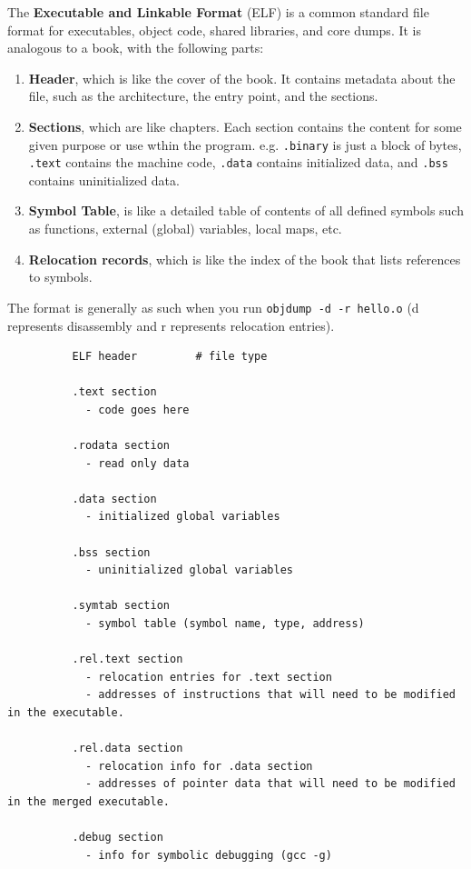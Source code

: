 \documentclass{article}
\begin{document}
      \begin{definition}[ELF]
        The \textbf{Executable and Linkable Format} (ELF) is a common standard file format for executables, object code, shared libraries, and core dumps. It is analogous to a book, with the following parts: 
        \begin{enumerate}
          \item \textbf{Header}, which is like the cover of the book. It contains metadata about the file, such as the architecture, the entry point, and the sections. 
          \item \textbf{Sections}, which are like chapters. Each section contains the content for some given purpose or use wthin the program. e.g. \texttt{.binary} is just a block of bytes, \texttt{.text} contains the machine code, \texttt{.data} contains initialized data, and \texttt{.bss} contains uninitialized data.
          \item \textbf{Symbol Table}, is like a detailed table of contents of all defined symbols such as functions, external (global) variables, local maps, etc. 
          \item \textbf{Relocation records}, which is like the index of the book that lists references to symbols. 
        \end{enumerate}
        The format is generally as such when you run \texttt{objdump -d -r hello.o} (d represents disassembly and r represents relocation entries).

        \begin{lstlisting}
          ELF header         # file type 

          .text section 
            - code goes here 

          .rodata section
            - read only data 

          .data section 
            - initialized global variables 

          .bss section 
            - uninitialized global variables

          .symtab section 
            - symbol table (symbol name, type, address) 

          .rel.text section 
            - relocation entries for .text section 
            - addresses of instructions that will need to be modified in the executable. 

          .rel.data section 
            - relocation info for .data section 
            - addresses of pointer data that will need to be modified in the merged executable. 

          .debug section 
            - info for symbolic debugging (gcc -g) 
        \end{lstlisting}
      \end{definition}
      
\end{document}
